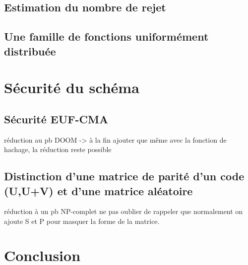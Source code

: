 \documentclass[12pt]{article}
\theoremstyle{definition}
\begin{document}
\subsection{Estimation du nombre de rejet}
\subsection{Une famille de fonctions uniformément distribuée}

\section{Sécurité du schéma}
\subsection{Sécurité EUF-CMA}
réduction au pb DOOM
-> à la fin ajouter que même avec la fonction de hachage, la réduction reste possible
\subsection{Distinction d'une matrice de parité d'un code (U,U+V) et d'une matrice aléatoire}
réduction à un pb NP-complet
ne pas oublier de rappeler que normalement on ajoute S et P pour masquer la forme de la matrice.

\section*{Conclusion}

\newpage




\end{document}
